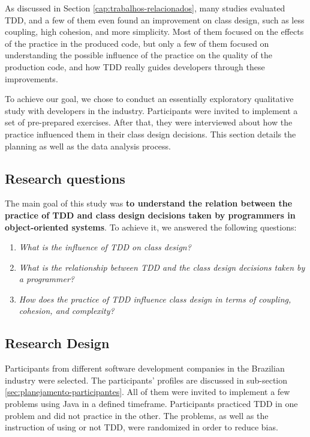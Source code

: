\documentclass[times]{elsarticle}
\begin{document}
As discussed in Section \ref{cap:trabalhos-relacionados}, many studies evaluated
TDD, and a few of them even found an improvement on class design, such as
less coupling, high cohesion, and more simplicity. Most of them focused on
the effects of the practice in the produced code, but only a few of them focused on understanding
the possible influence of the practice on the quality of the production code, 
and how TDD really guides developers through these improvements.

To achieve our goal, we chose to conduct an essentially 
exploratory qualitative study with developers in the industry. Participants
were invited to implement a set of pre-prepared exercises. After that,
they were interviewed about how the practice influenced them in their
class design decisions. This section details the planning as well as
the data analysis process.


\subsection{Research questions}

The main goal of this study was \textbf{to understand the relation between
the practice of TDD and class design decisions taken by programmers in object-oriented
systems}. To achieve it, we answered the following questions:

\begin{enumerate}

	\item \textit{What is the influence of TDD on class design?}

	\item \textit{What is the relationship between TDD and the class design decisions taken
	by a programmer?}

	\item \textit{How does the practice of TDD influence class design in terms of coupling, 
	cohesion, and complexity?}

\end{enumerate}

\subsection{Research Design}

Participants from different software development companies in the Brazilian
industry were selected. The participants' profiles are discussed in sub-section
\ref{sec:planejamento-participantes}. All of them were invited to implement
a few problems using Java in a defined timeframe. Participants practiced
TDD in one problem and did not practice in the other. The problems,
as well as the instruction of using or not TDD, were
randomized in order to reduce bias.
\end{document}
